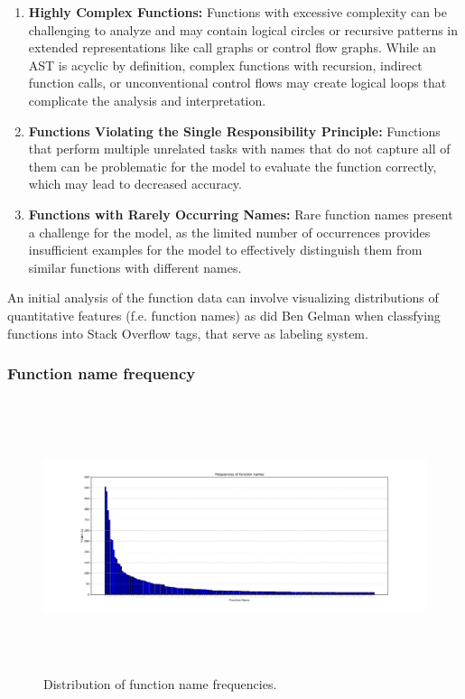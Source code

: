 \documentclass[10pt,english,a4paper]{report}
\begin{document}
\begin{enumerate}
\begin{enumerate}
        \item \textbf{Highly Complex Functions:}
        \label{item:complex_functions}
        Functions with excessive complexity can be challenging to analyze and may contain logical circles or recursive patterns in extended representations like call graphs or control flow graphs. While an AST is acyclic by definition, complex functions with recursion, indirect function calls, or unconventional control flows may create logical loops that complicate the analysis and interpretation.

        \item \textbf{Functions Violating the Single Responsibility Principle:}
        \label{item:single_responsibility}
        Functions that perform multiple unrelated tasks with names that do not capture all of them can be problematic for the model to evaluate the function correctly, which may lead to decreased accuracy.

        \item \textbf{Functions with Rarely Occurring Names:}
        \label{item:rare_names}
        Rare function names present a challenge for the model, as the limited number of occurrences provides insufficient examples for the model to effectively distinguish them from similar functions with different names.
    \end{enumerate}
\end{enumerate}

An initial analysis of the function data can involve visualizing distributions of quantitative features (f.e. function names)
as did Ben Gelman \cite{gelman} when classfying functions into Stack Overflow tags, that serve as labeling system.


\subsubsection{Function name frequency}
\begin{figure}[H]
    \centering
    \includegraphics[width=16cm, height=8cm]{figures/names_merged.pdf}
    \caption{Distribution of function name frequencies.}
    \label{fig:func_freq_merged}
\end{figure}
\end{document}
